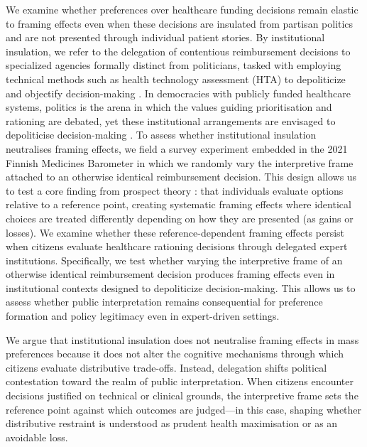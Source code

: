 \documentclass[11pt]{article}\usepackage[]{graphicx}\usepackage[]{xcolor}
\begin{document}
We examine whether preferences over healthcare funding decisions remain elastic to framing effects even when these decisions are insulated from partisan politics and are not presented through individual patient stories. By institutional insulation, we refer to the delegation of contentious 
reimbursement decisions to specialized agencies formally distinct from  politicians, tasked with employing technical methods such as health technology 
assessment (HTA) to depoliticize and objectify decision-making 
\parencite{EgebergTrondal2009Agencification, Thatcher2002}. In democracies with publicly funded healthcare systems, politics is the arena in which the values guiding prioritisation and rationing are debated, yet these institutional arrangements are envisaged to depoliticise decision-making \parencite{Thatcher2002}. To assess whether institutional insulation neutralises framing effects, we field a survey experiment embedded in the 2021 Finnish Medicines Barometer in which we randomly vary the interpretive frame attached to an otherwise identical reimbursement decision. This design allows us to test a core finding from prospect theory \parencite{Kahneman1979}: that individuals evaluate options relative to a reference point, creating systematic framing effects where identical choices are treated differently depending on how they are presented (as gains or losses). We examine whether these reference-dependent framing effects persist when citizens evaluate healthcare rationing decisions through delegated expert institutions. Specifically, we test whether varying the interpretive frame of an otherwise identical reimbursement decision produces framing effects even in institutional contexts designed to depoliticize decision-making. This allows us to assess whether public interpretation remains consequential for preference formation and policy legitimacy even in expert-driven settings. 

We argue that institutional insulation does not neutralise framing effects in mass preferences because it does not alter the cognitive mechanisms through which citizens evaluate distributive trade-offs. Instead, delegation shifts political contestation toward the realm of public interpretation. When citizens encounter decisions justified on technical or clinical grounds, the interpretive frame sets the reference point against which outcomes are judged---in this case, shaping whether distributive restraint is understood as prudent health maximisation or as an avoidable loss.
\end{document}
